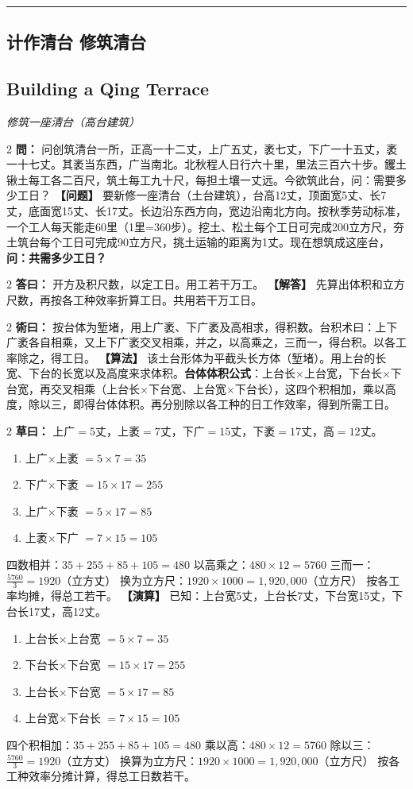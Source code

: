 \documentclass[11pt,a4paper]{article}
\newcommand{\longline}{\noindent\rule{\textwidth}{0.4pt}}
\newcommand{\bilingualProblem}[2]{%
  \vspace{0.6em}%
  \begin{paracol}{2}%
  \noindent\textcolor{problemcolor}{\textbf{問：}}#1%
  \switchcolumn%
  \noindent\textcolor{problemcolor}{\textbf{【问题】}}#2%
  \end{paracol}%
  \vspace{0.3em}%
}
\newcommand{\bilingualAnswer}[2]{%
  \begin{paracol}{2}%
  \noindent\textcolor{answercolor}{\textbf{答曰：}}#1%
  \switchcolumn%
  \noindent\textcolor{answercolor}{\textbf{【解答】}}#2%
  \end{paracol}%
  \vspace{0.3em}%
}
\newcommand{\bilingualMethod}[2]{%
  \begin{paracol}{2}%
  \noindent\textcolor{methodcolor}{\textbf{術曰：}}#1%
  \switchcolumn%
  \noindent\textcolor{methodcolor}{\textbf{【算法】}}#2%
  \end{paracol}%
  \vspace{0.3em}%
}
\newcommand{\bilingualWorking}[2]{%
  \begin{paracol}{2}%
  \noindent\textcolor{workingcolor}{\textbf{草曰：}}#1%
  \switchcolumn%
  \noindent\textcolor{workingcolor}{\textbf{【演算】}}#2%
  \end{paracol}%
  \vspace{0.3em}%
}
\newcommand{\bilingualSubsection}[2]{%
  \subsection{#1}
  \begin{center}
  {\small\color{sectioncolor}\textit{#2}}
  \end{center}
  \vspace{0.3em}
}
\begin{document}
\vspace{0.8em}
\longline

\subsection{计作清台 \quad 修筑清台}
\bilingualSubsection{Building a Qing Terrace}{修筑一座清台（高台建筑）}

\bilingualProblem{%
问创筑清台一所，正高一十二丈，上广五丈，袤七丈，下广一十五丈，袤一十七丈。其袤当东西，广当南北。北秋程人日行六十里，里法三百六十步。钁土锹土每工各二百尺，筑土每工九十尺，每担土壤一丈远。今欲筑此台，问：需要多少工日？%
}{%
要新修一座清台（土台建筑），台高12丈，顶面宽5丈、长7丈，底面宽15丈、长17丈。长边沿东西方向，宽边沿南北方向。按秋季劳动标准，一个工人每天能走60里（1里=360步）。挖土、松土每个工日可完成200立方尺，夯土筑台每个工日可完成90立方尺，挑土运输的距离为1丈。现在想筑成这座台，\textbf{问：共需多少工日？}%
}

\bilingualAnswer{%
开方及积尺数，以定工日。用工若干万工。%
}{%
先算出体积和立方尺数，再按各工种效率折算工日。共用若干万工日。%
}

\bilingualMethod{%
按台体为堑堵，用上广袤、下广袤及高相求，得积数。台积术曰：上下广袤各自相乘，又上下广袤交叉相乘，并之，以高乘之，三而一，得台积。以各工率除之，得工日。%
}{%
该土台形体为平截头长方体（堑堵）。用上台的长宽、下台的长宽以及高度来求体积。\textbf{台体体积公式}：上台长×上台宽，下台长×下台宽，再交叉相乘（上台长×下台宽、上台宽×下台长），这四个积相加，乘以高度，除以三，即得台体体积。再分别除以各工种的日工作效率，得到所需工日。%
}

\bilingualWorking{%
上广$=5$丈，上袤$=7$丈，下广$=15$丈，下袤$=17$丈，高$=12$丈。
\begin{enumerate}
  \item 上广$\times$上袤 $= 5 \times 7 = 35$
  \item 下广$\times$下袤 $= 15 \times 17 = 255$
  \item 上广$\times$下袤 $= 5 \times 17 = 85$
  \item 上袤$\times$下广 $= 7 \times 15 = 105$
\end{enumerate}
四数相并：$35 + 255 + 85 + 105 = 480$
以高乘之：$480 \times 12 = 5760$
三而一：$\displaystyle\frac{5760}{3} = 1920$（立方丈）
换为立方尺：$1920 \times 1000 = 1{,}920{,}000$（立方尺）
按各工率均摊，得总工若干。%
}{%
已知：上台宽5丈，上台长7丈，下台宽15丈，下台长17丈，高12丈。
\begin{enumerate}
  \item 上台长$\times$上台宽 $= 5 \times 7 = 35$
  \item 下台长$\times$下台宽 $= 15 \times 17 = 255$
  \item 上台长$\times$下台宽 $= 5 \times 17 = 85$
  \item 上台宽$\times$下台长 $= 7 \times 15 = 105$
\end{enumerate}
四个积相加：$35 + 255 + 85 + 105 = 480$
乘以高：$480 \times 12 = 5760$
除以三：$\displaystyle\frac{5760}{3} = 1920$（立方丈）
换算为立方尺：$1920 \times 1000 = 1{,}920{,}000$（立方尺）
按各工种效率分摊计算，得总工日数若干。%
}
\end{document}
